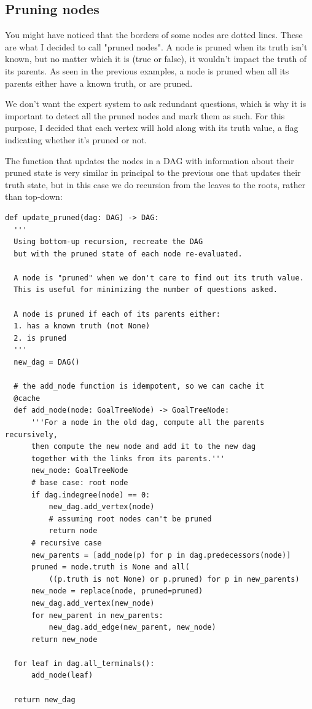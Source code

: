 \documentclass[11pt]{article}
\begin{document}
\subsection{Pruning nodes}
\label{sec:org4515701}

You might have noticed that the borders of some nodes are dotted lines.
These are what I decided to call "pruned nodes".
A node is pruned when its truth isn't known, but no matter which it is (true or false),
it wouldn't impact the truth of its parents.
As seen in the previous examples, a node is pruned when all its parents
either have a known truth, or are pruned.

We don't want the expert system to ask redundant questions,
which is why it is important to detect all the pruned nodes and mark them as such.
For this purpose, I decided that each vertex will hold along with its truth value,
a flag indicating whether it's pruned or not.

The function that updates the nodes in a DAG with information about their pruned state
is very similar in principal to the previous one that updates their truth state,
but in this case we do recursion from the leaves to the roots, rather than top-down:
\begin{verbatim}
def update_pruned(dag: DAG) -> DAG:
  '''
  Using bottom-up recursion, recreate the DAG
  but with the pruned state of each node re-evaluated.

  A node is "pruned" when we don't care to find out its truth value.
  This is useful for minimizing the number of questions asked.

  A node is pruned if each of its parents either:
  1. has a known truth (not None)
  2. is pruned
  '''
  new_dag = DAG()

  # the add_node function is idempotent, so we can cache it
  @cache
  def add_node(node: GoalTreeNode) -> GoalTreeNode:
      '''For a node in the old dag, compute all the parents recursively,
      then compute the new node and add it to the new dag
      together with the links from its parents.'''
      new_node: GoalTreeNode
      # base case: root node
      if dag.indegree(node) == 0:
          new_dag.add_vertex(node)
          # assuming root nodes can't be pruned
          return node
      # recursive case
      new_parents = [add_node(p) for p in dag.predecessors(node)]
      pruned = node.truth is None and all(
          ((p.truth is not None) or p.pruned) for p in new_parents)
      new_node = replace(node, pruned=pruned)
      new_dag.add_vertex(new_node)
      for new_parent in new_parents:
          new_dag.add_edge(new_parent, new_node)
      return new_node

  for leaf in dag.all_terminals():
      add_node(leaf)

  return new_dag
\end{verbatim}
\end{document}
